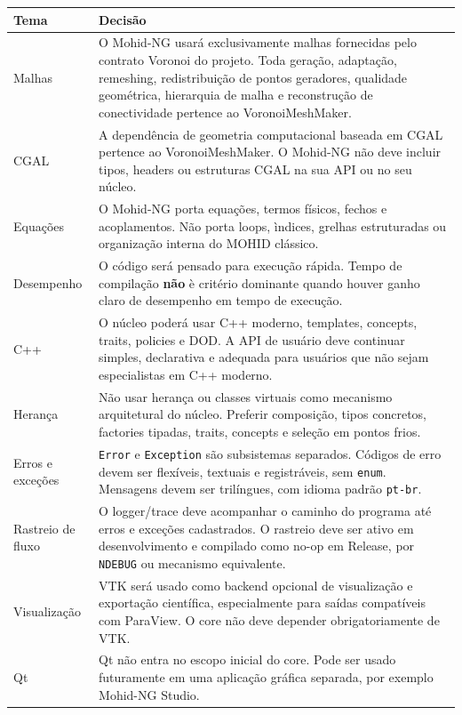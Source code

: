 \documentclass[11pt,a4paper]{article}
\begin{document}
\begin{longtable}{p{}p{}}
\toprule
\textbf{Tema} & \textbf{Decis\~ao}\tabularnewline
\midrule
Malhas & O Mohid-NG usar\'a exclusivamente malhas fornecidas pelo contrato Voronoi do projeto. Toda gera\c{c}\~ao, adapta\c{c}\~ao, remeshing, redistribui\c{c}\~ao de pontos geradores, qualidade geom\'etrica, hierarquia de malha e reconstru\c{c}\~ao de conectividade pertence ao VoronoiMeshMaker.\tabularnewline
\addlinespace
CGAL & A depend\^encia de geometria computacional baseada em CGAL pertence ao VoronoiMeshMaker. O Mohid-NG n\~ao deve incluir tipos, headers ou estruturas CGAL na sua API ou no seu n\'ucleo.\tabularnewline
\addlinespace
Equa\c{c}\~oes & O Mohid-NG porta equa\c{c}\~oes, termos f\'isicos, fechos e acoplamentos. N\~ao porta loops, \`indices, grelhas estruturadas ou organiza\c{c}\~ao interna do MOHID cl\'assico.\tabularnewline
\addlinespace
Desempenho & O c\'odigo ser\'a pensado para execu\c{c}\~ao r\'apida. Tempo de compila\c{c}\~ao \textbf{n\~ao} \`e crit\'erio dominante quando houver ganho claro de desempenho em tempo de execu\c{c}\~ao.\tabularnewline
\addlinespace
C++ & O n\'ucleo poder\'a usar C++ moderno, templates, concepts, traits, policies e DOD. A API de usu\'ario deve continuar simples, declarativa e adequada para usu\'arios que n\~ao sejam especialistas em C++ moderno.\tabularnewline
\addlinespace
Heran\c{c}a & N\~ao usar heran\c{c}a ou classes virtuais como mecanismo arquitetural do n\'ucleo. Preferir composi\c{c}\~ao, tipos concretos, factories tipadas, traits, concepts e sele\c{c}\~ao em pontos frios.\tabularnewline
\addlinespace
Erros e exce\c{c}\~oes & \texttt{Error} e \texttt{Exception} s\~ao subsistemas separados. C\'odigos de erro devem ser flex\'iveis, textuais e registr\'aveis, sem \texttt{enum}. Mensagens devem ser tril\'ingues, com idioma padr\~ao \texttt{pt-br}.\tabularnewline
\addlinespace
Rastreio de fluxo & O logger/trace deve acompanhar o caminho do programa at\'e erros e exce\c{c}\~oes cadastrados. O rastreio deve ser ativo em desenvolvimento e compilado como no-op em Release, por \texttt{NDEBUG} ou mecanismo equivalente.\tabularnewline
\addlinespace
Visualiza\c{c}\~ao & VTK ser\'a usado como backend opcional de visualiza\c{c}\~ao e exporta\c{c}\~ao cient\'ifica, especialmente para sa\'idas compat\'iveis com ParaView. O core n\~ao deve depender obrigatoriamente de VTK.\tabularnewline
\addlinespace
Qt & Qt n\~ao entra no escopo inicial do core. Pode ser usado futuramente em uma aplica\c{c}\~ao gr\'afica separada, por exemplo Mohid-NG Studio.\tabularnewline

\end{longtable}
\end{document}
